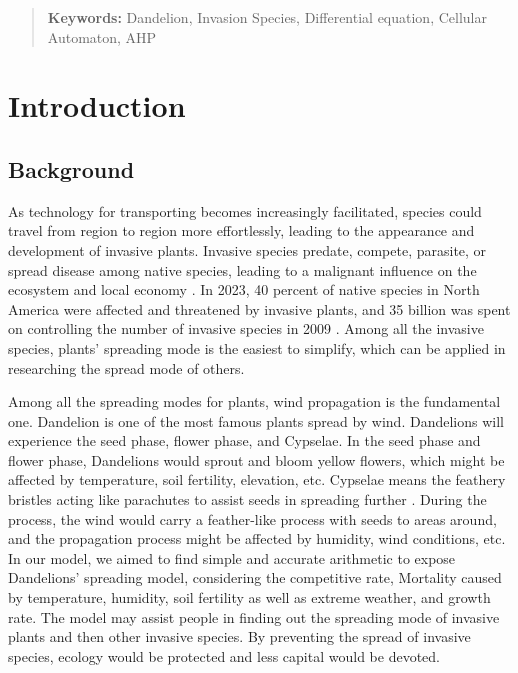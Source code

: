 \documentclass[12pt]{article}
\begin{document}
\begin{abstract}
    
    
    \textbf{Keywords:} Dandelion, Invasion Species, Differential equation, Cellular Automaton, AHP
\end{abstract}

\newpage

\section{Introduction}
\subsection{Background}
As technology for transporting becomes increasingly facilitated, species could travel from region to region more effortlessly, leading to the appearance and development of invasive plants. Invasive species predate, compete, parasite, or spread disease among native species, leading to a malignant influence on the ecosystem and local economy \cite{barbier_implementing_2013}. In 2023, 40 percent of native species in North America were affected and threatened by invasive plants, and 35 billion was spent on controlling the number of invasive species in 2009 \cite{chornesky_threat_2003}. Among all the invasive species, plants’ spreading mode is the easiest to simplify, which can be applied in researching the spread mode of others. 

Among all the spreading modes for plants, wind propagation is the fundamental one. Dandelion is one of the most famous plants spread by wind. Dandelions will experience the seed phase, flower phase, and Cypselae. In the seed phase and flower phase, Dandelions would sprout and bloom yellow flowers, which might be affected by temperature, soil fertility, elevation, etc. Cypselae means the feathery bristles acting like parachutes to assist seeds in spreading further \cite{lagidze_dandelion_2022}. During the process, the wind would carry a feather-like process with seeds to areas around, and the propagation process might be affected by humidity, wind conditions, etc. In our model, we aimed to find simple and accurate arithmetic to expose Dandelions’ spreading model, considering the competitive rate, Mortality caused by temperature, humidity, soil fertility as well as extreme weather, and growth rate. The model may assist people in finding out the spreading mode of invasive plants and then other invasive species. By preventing the spread of invasive species, ecology would be protected and less capital would be devoted.
\end{document}
